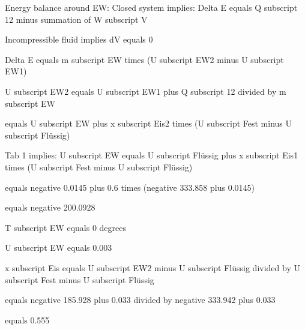 Energy balance around EW:  
Closed system implies:  
Delta E equals Q subscript 12 minus summation of W subscript V  

Incompressible fluid implies dV equals 0  

Delta E equals m subscript EW times (U subscript EW2 minus U subscript EW1)  

U subscript EW2 equals U subscript EW1 plus Q subscript 12 divided by m subscript EW  

equals U subscript EW plus x subscript Eis2 times (U subscript Fest minus U subscript Flüssig)  

Tab 1 implies:  
U subscript EW equals U subscript Flüssig plus x subscript Eis1 times (U subscript Fest minus U subscript Flüssig)  

equals negative 0.0145 plus 0.6 times (negative 333.858 plus 0.0145)  

equals negative 200.0928  

T subscript EW equals 0 degrees  

U subscript EW equals 0.003  

x subscript Eis equals U subscript EW2 minus U subscript Flüssig divided by U subscript Fest minus U subscript Flüssig  

equals negative 185.928 plus 0.033 divided by negative 333.942 plus 0.033  

equals 0.555